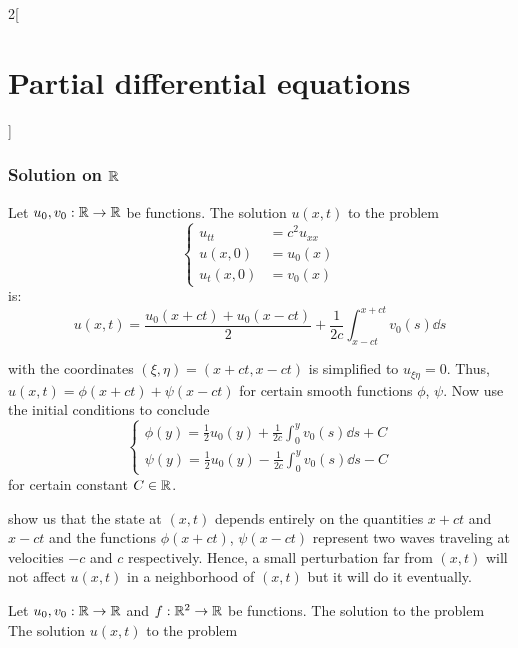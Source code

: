 \documentclass[../../../main_math.tex]{subfiles}
\begin{document}
\begin{multicols}{2}[\section{Partial differential equations}]
  \subsubsection{Solution on \texorpdfstring{$\mathbb{R}$}{R}}
  \begin{proposition}\label{PDE:propdAlembert}
    Let $u_0,v_0:\mathbb{R}\rightarrow\mathbb{R}$ be functions. The solution $u(x,t)$ to the problem
    \begin{equation*}
      \left\{
      \begin{aligned}
        u_{tt}   & =c^2u_{xx} \\
        u(x,0)   & =u_0(x)    \\
        u_t(x,0) & =v_0(x)
      \end{aligned}
      \right.
    \end{equation*} is:
    \begin{equation}\label{PDE:dAlembert}
      u(x,t)=\frac{u_0(x+ct)+u_0(x-ct)}{2}+\frac{1}{2c}\int_{x-ct}^{x+ct}v_0(s)\dd{s}
    \end{equation}
  \end{proposition}
  \begin{sproof}
     with the coordinates $(\xi, \eta) = (x+ ct,x-ct)$ is simplified to $u_{\xi\eta}=0$. Thus, $u(x,t)=\phi(x+ct)+\psi(x-ct)$ for certain smooth functions $\phi$, $\psi$. Now use the initial conditions to conclude
    $$
      \begin{cases}
        \displaystyle \phi(y)=\frac{1}{2}u_0(y)+\frac{1}{2c}\int_0^yv_0(s)\dd{s}+C \\
        \displaystyle \psi(y) = \frac{1}{2}u_0(y)-\frac{1}{2c}\int_0^yv_0(s)\dd{s}-C
      \end{cases}
    $$
    for certain constant $C\in\mathbb{R}$.
  \end{sproof}
  \begin{remark}
     show us that the state at $(x,t)$ depends entirely on the quantities $x+ct$ and $x-ct$ and the functions $\phi(x+ct)$, $\psi(x-ct)$ represent two waves traveling at velocities $-c$ and $c$ respectively. Hence, a small perturbation far from $(x,t)$ will not affect $u(x,t)$ in a neighborhood of $(x,t)$ but it will do it eventually.
  \end{remark}
  \begin{theorem}
    Let $u_0,v_0:\mathbb{R}\rightarrow\mathbb{R}$ and $f:\mathbb{R}^2\rightarrow\mathbb{R}$ be functions. The solution to the problem
    The solution $u(x,t)$ to the problem
    \begin{equation}\label{PDE:waveeqdriven}

\end{equation}
\end{theorem}
\end{multicols}
\end{document}
